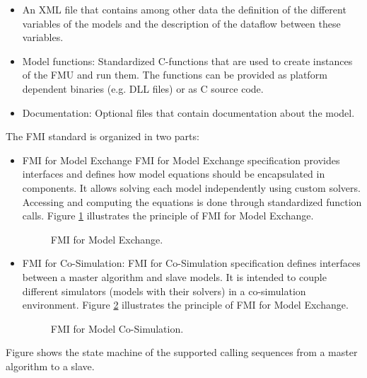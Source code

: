 \begin{itemize}
\item An XML file that contains among other data the definition of the different variables of the models and the description of the dataflow between these variables. 
\item Model functions: Standardized C-functions that are used to create instances of the FMU and run them. The functions can be provided as platform dependent binaries (e.g. DLL files) or as C source code.
\item Documentation: Optional files that contain documentation about the model.
\end{itemize}

The FMI standard is organized in two parts:
\begin{itemize}
\item FMI for Model Exchange
FMI for Model Exchange specification provides interfaces and defines how model equations should be encapsulated in components. It allows solving each model independently using custom solvers. Accessing and computing the equations is done through standardized function calls. Figure \ref{fig:fmimdlexg} illustrates the principle of FMI for Model Exchange.

\begin{figure}[phbt]
\centering

\caption{FMI for Model Exchange.}
\label{fig:fmimdlexg}
\end{figure}

\item FMI for Co-Simulation:
FMI for Co-Simulation specification defines interfaces between a master algorithm and slave models. It is intended to couple different simulators (models with their solvers) in a co-simulation environment. Figure \ref{fig:fmicosim} illustrates the principle of FMI for Model Exchange.

\begin{figure}[phbt]
\centering

\caption{FMI for Model Co-Simulation.}
\label{fig:fmicosim}
\end{figure} 
\end{itemize}

Figure shows the state machine of the supported calling sequences from a master algorithm to a slave.




